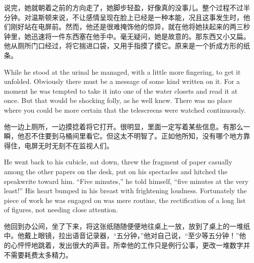 \begin{paracol}{2}
\switchcolumn

说完，她就朝着之前的方向走了，她脚步轻盈，好像真的没事儿。整个过程不过半分钟。对温斯顿来说，不让感情呈现在脸上已经是一种本能，况且这事发生时，他们刚好站在电屏前。然而，他还是很难掩饰他的惊异，就在他将她扶起来的两三秒钟里，她迅速将一件东西塞在他手中。毫无疑问，她是故意的。那东西又小又扁。他从厕所门口经过，将它揣进口袋，又用手指摸了摸它。原来是一个折成方形的纸条。

\switchcolumn*

While he stood at the urinal he managed, with a little more fingering,
to get it unfolded. Obviously there must be a message of some kind
written on it. For a moment he was tempted to take it into one of the
water closets and read it at once. But that would be shocking folly, as
he well knew. There was no place where you could be more certain that
the telescreens were watched continuously.

\switchcolumn

他一边上厕所，一边摸捻着将它打开。很明显，里面一定写着某些信息。有那么一瞬，他忍不住要到马桶间里看它。但这太不明智了。正如他所知，没有哪个地方靠得住，电屏无时无刻不在监视人们。

\switchcolumn*

He went back to his cubicle, sat down, threw the fragment of paper
casually among the other papers on the desk, put on his spectacles and
hitched the speakwrite toward him. ``Five minutes,'' he told himself,
``five minutes at the very least!'' His heart bumped in his breast with
frightening loudness. Fortunately the piece of work he was engaged on
was mere routine, the rectification of a long list of figures, not
needing close attention.

\switchcolumn

他回到办公间，坐了下来，将这张纸随随便便地往桌上一放，放到了桌上的一堆纸中。他戴上眼镜，拉出语音记录器，``五分钟，''他对自己说，``至少等五分钟！''他的心怦怦地跳着，发出很大的声音。所幸他的工作只是例行公事，更改一堆数字并不需要耗费太多精力。

\switchcolumn*


\end{paracol}
